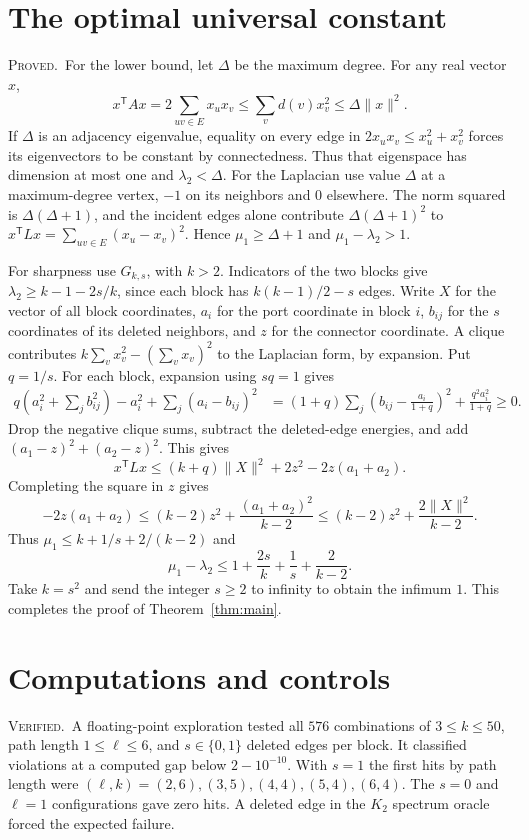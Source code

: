 \documentclass[11pt,a4paper]{article}
\newcommand{\gap}{\mu_1-\lambda_2}
\newcommand{\proved}{\textsc{Proved.}}
\newcommand{\verified}{\textsc{Verified.}}
\begin{document}
\section{The optimal universal constant}

\proved\ For the lower bound, let $\Delta$ be the maximum degree. For any real vector $x$,
\[
x^{\mathsf T}Ax=2\sum_{uv\in E}x_u x_v\le\sum_v d(v)x_v^2\le\Delta\|x\|^2.
\]
If $\Delta$ is an adjacency eigenvalue, equality on every edge in $2x_ux_v\le x_u^2+x_v^2$ forces its eigenvectors to be constant by connectedness. Thus that eigenspace has dimension at most one and $\lambda_2<\Delta$. For the Laplacian use value $\Delta$ at a maximum-degree vertex, $-1$ on its neighbors and $0$ elsewhere. The norm squared is $\Delta(\Delta+1)$, and the incident edges alone contribute $\Delta(\Delta+1)^2$ to $x^{\mathsf T}Lx=\sum_{uv\in E}(x_u-x_v)^2$. Hence $\mu_1\ge\Delta+1$ and $\gap>1$.

For sharpness use $G_{k,s}$, with $k>2$. Indicators of the two blocks give $\lambda_2\ge k-1-2s/k$, since each block has $k(k-1)/2-s$ edges. Write $X$ for the vector of all block coordinates, $a_i$ for the port coordinate in block $i$, $b_{ij}$ for the $s$ coordinates of its deleted neighbors, and $z$ for the connector coordinate. A clique contributes $k\sum_v x_v^2-(\sum_v x_v)^2$ to the Laplacian form, by expansion. Put $q=1/s$. For each block, expansion using $sq=1$ gives
\begin{align*}
q\left(a_i^2+\sum_j b_{ij}^2\right)-a_i^2+\sum_j(a_i-b_{ij})^2
&=(1+q)\sum_j\left(b_{ij}-\frac{a_i}{1+q}\right)^2+\frac{q^2a_i^2}{1+q}\ge0.
\end{align*}
Drop the negative clique sums, subtract the deleted-edge energies, and add $(a_1-z)^2+(a_2-z)^2$. This gives
\[
x^{\mathsf T}Lx\le(k+q)\|X\|^2+2z^2-2z(a_1+a_2).
\]
Completing the square in $z$ gives
\[
-2z(a_1+a_2)\le(k-2)z^2+\frac{(a_1+a_2)^2}{k-2}\le(k-2)z^2+\frac{2\|X\|^2}{k-2}.
\]
Thus $\mu_1\le k+1/s+2/(k-2)$ and
\[
\gap\le 1+\frac{2s}{k}+\frac1s+\frac2{k-2}.
\]
Take $k=s^2$ and send the integer $s\ge2$ to infinity to obtain the infimum $1$. This completes the proof of Theorem~\ref{thm:main}.

\section{Computations and controls}

\verified\ A floating-point exploration tested all $576$ combinations of $3\le k\le50$, path length $1\le\ell\le6$, and $s\in\{0,1\}$ deleted edges per block. It classified violations at a computed gap below $2-10^{-10}$. With $s=1$ the first hits by path length were $(\ell,k)=(2,6),(3,5),(4,4),(5,4),(6,4)$. The $s=0$ and $\ell=1$ configurations gave zero hits. A deleted edge in the $K_2$ spectrum oracle forced the expected failure.
\end{document}
